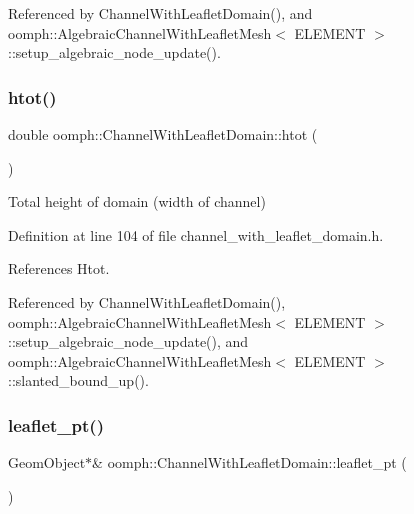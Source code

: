 Referenced by Channel\+With\+Leaflet\+Domain(), and oomph\+::\+Algebraic\+Channel\+With\+Leaflet\+Mesh$<$ E\+L\+E\+M\+E\+N\+T $>$\+::setup\+\_\+algebraic\+\_\+node\+\_\+update().

\mbox{\label{classoomph_1_1ChannelWithLeafletDomain_aaf195c688423473ed97af61f8a1467ab}} 
\subsubsection{\texorpdfstring{htot()}{htot()}}
{\footnotesize\ttfamily double oomph\+::\+Channel\+With\+Leaflet\+Domain\+::htot (\begin{DoxyParamCaption}{ }\end{DoxyParamCaption})\hspace{0.3cm}{\ttfamily [inline]}}



Total height of domain (width of channel) 



Definition at line 104 of file channel\+\_\+with\+\_\+leaflet\+\_\+domain.\+h.



References Htot.



Referenced by Channel\+With\+Leaflet\+Domain(), oomph\+::\+Algebraic\+Channel\+With\+Leaflet\+Mesh$<$ E\+L\+E\+M\+E\+N\+T $>$\+::setup\+\_\+algebraic\+\_\+node\+\_\+update(), and oomph\+::\+Algebraic\+Channel\+With\+Leaflet\+Mesh$<$ E\+L\+E\+M\+E\+N\+T $>$\+::slanted\+\_\+bound\+\_\+up().

\mbox{\label{classoomph_1_1ChannelWithLeafletDomain_a91d7d8d2f564c5e9d2ee07449b2653c9}} 
\subsubsection{\texorpdfstring{leaflet\+\_\+pt()}{leaflet\_pt()}}
{\footnotesize\ttfamily Geom\+Object$\ast$\& oomph\+::\+Channel\+With\+Leaflet\+Domain\+::leaflet\+\_\+pt (\begin{DoxyParamCaption}{ }\end{DoxyParamCaption})\hspace{0.3cm}{\ttfamily [inline]}}



